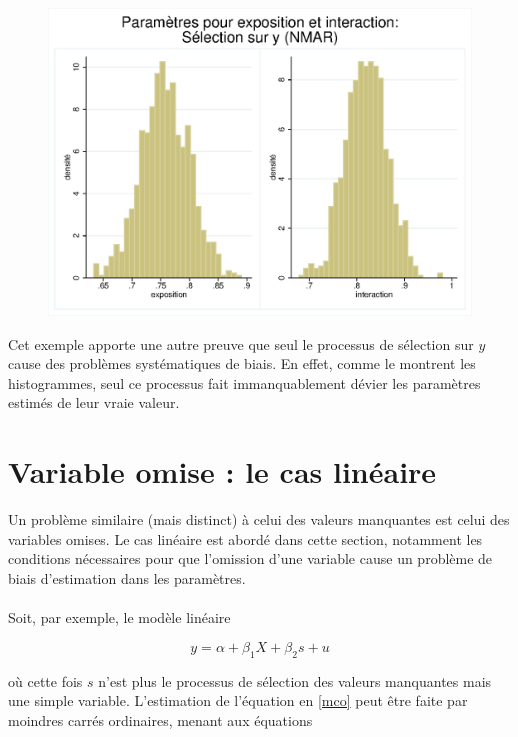 \documentclass{article}
\begin{document}
\begin{figure}[H]
\centering
\includegraphics[scale=1]{selecty.eps}
\end{figure}

Cet exemple apporte une autre preuve que seul le processus de s\'{e}lection sur $y$ cause des probl\`{e}mes syst\'{e}matiques de biais. En effet, comme le montrent les histogrammes, seul ce processus fait immanquablement d\'{e}vier les param\`{e}tres estim\'{e}s de leur vraie valeur.


\appendix

\newpage

\section{Variable omise : le cas lin\'{e}aire}
Un probl\`{e}me similaire (mais distinct) \`{a} celui des valeurs manquantes est celui des variables omises. Le cas lin\'{e}aire est abord\'{e} dans cette section, notamment les conditions n\'{e}cessaires pour que l'omission d'une variable cause un probl\`{e}me de biais d'estimation dans les  param\`{e}tres.
\\
\\
Soit, par exemple, le mod\`{e}le lin\'{e}aire 

\begin{equation}
\label{mco}
y=\alpha+\beta_1X+\beta_2s+u
\end{equation}

o\`{u} cette fois $s$ n'est plus le processus de s\'{e}lection des valeurs manquantes mais une simple variable. L'estimation de l'\'{e}quation en \eqref{mco} peut \^{e}tre faite par moindres carr\'{e}s ordinaires, menant aux \'{e}quations 
\end{document}
